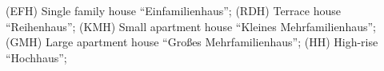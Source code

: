 (EFH) Single family house ``Einfamilienhaus'';
(RDH) Terrace house ``Reihenhaus'';
(KMH) Small apartment house ``Kleines Mehrfamilienhaus'';
(GMH) Large apartment house ``Großes Mehrfamilienhaus'';
(HH) High-rise ``Hochhaus'';
